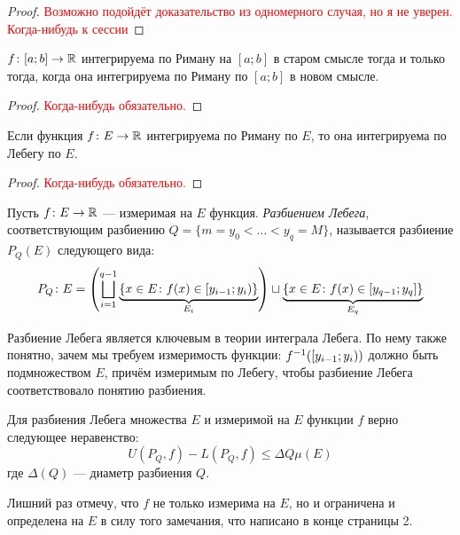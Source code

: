 \begin{proof}
	\textcolor{red}{Возможно подойдёт доказательство из одномерного случая, но я не уверен. Когда-нибудь к сессии}
\end{proof}

\begin{proposition}
	$f \colon [a; b] \to \mathbb{R}$ интегрируема по Риману на $[a; b]$ в старом смысле тогда и только тогда, когда она интегрируема по Риману по $[a; b]$ в новом смысле.
\end{proposition}

\begin{proof}
	\textcolor{red}{Когда-нибудь обязательно.}
\end{proof}

\begin{proposition}
	Если функция $f \colon E \to \mathbb{R}$ интегрируема по Риману по $E$, то она интегрируема по Лебегу по $E$.
\end{proposition}

\begin{proof}
	\textcolor{red}{Когда-нибудь обязательно.}
\end{proof}

\begin{definition}
	Пусть $f \colon E \to \mathbb{R}$ --- измеримая на $E$ функция. \textit{Разбиением Лебега}, соответствующим разбиению $Q = \{m = y_0 < \ldots < y_q = M\}$, называется разбиение $P_Q(E)$ следующего вида:
	\[
		P_Q \colon E = \left(\bigsqcup_{i = 1}^{q - 1} \underbrace{\{x \in E \colon f(x) \in \left[y_{i - 1}; y_i\right)\}}_{E_i}\right) \sqcup \underbrace{\{x \in E \colon f(x) \in [y_{q - 1}; y_q]\}}_{E_q}
	\]
\end{definition}

\begin{note}
	Разбиение Лебега является ключевым в теории интеграла Лебега. По нему также понятно, зачем мы требуем измеримость функции: $f^{-1}(\left[y_{i - 1}; y_i\right))$ должно быть подмножеством $E$, причём измеримым по Лебегу, чтобы разбиение Лебега соответствовало понятию разбиения.
\end{note}

\begin{proposition} \label{uminl-le-dqe}
	Для разбиения Лебега множества $E$ и измеримой на $E$ функции $f$ верно следующее неравенство:
	\[
		U(P_Q, f) - L(P_Q, f) \le \Delta Q \mu(E)
	\]
	где $\Delta(Q)$ --- диаметр разбиения $Q$.
\end{proposition}

\begin{anote}
	Лишний раз отмечу, что $f$ не только измерима на $E$, но и ограничена и определена на $E$ в силу того замечания, что написано в конце страницы 2.
\end{anote}


